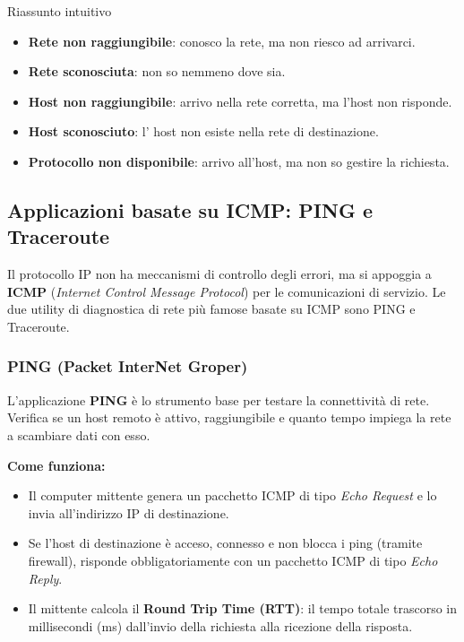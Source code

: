 \documentclass[a4paper,12pt]{report}
\begin{document}
\begin{notebox}{Riassunto intuitivo}
\begin{itemize}
    \item \textbf{Rete non raggiungibile}: conosco la rete, ma non riesco ad arrivarci.
    \item \textbf{Rete sconosciuta}: non so nemmeno dove sia.
    \item \textbf{Host non raggiungibile}: arrivo nella rete corretta, ma l'host non risponde.
    \item \textbf{Host sconosciuto}: l’ host non esiste nella rete di destinazione.
    \item \textbf{Protocollo non disponibile}: arrivo all’host, ma non so gestire la richiesta.
\end{itemize}
\end{notebox}


\subsection{Applicazioni basate su ICMP: PING e Traceroute}

Il protocollo IP non ha meccanismi di controllo degli errori, ma si appoggia a \textbf{ICMP} (\textit{Internet Control Message Protocol}) per le comunicazioni di servizio. Le due utility di diagnostica di rete più famose basate su ICMP sono PING e Traceroute.

\vspace{0.3cm}
\subsubsection*{PING (Packet InterNet Groper)}

L'applicazione \textbf{PING} è lo strumento base per testare la connettività di rete. Verifica se un host remoto è attivo, raggiungibile e quanto tempo impiega la rete a scambiare dati con esso.

\textbf{Come funziona:}
\begin{itemize}[leftmargin=*]
    \item Il computer mittente genera un pacchetto ICMP di tipo \textit{Echo Request} e lo invia all'indirizzo IP di destinazione.
    \item Se l'host di destinazione è acceso, connesso e non blocca i ping (tramite firewall), risponde obbligatoriamente con un pacchetto ICMP di tipo \textit{Echo Reply}.
    \item Il mittente calcola il \textbf{Round Trip Time (RTT)}: il tempo totale trascorso in millisecondi (ms) dall'invio della richiesta alla ricezione della risposta.
\end{itemize}
\end{document}
